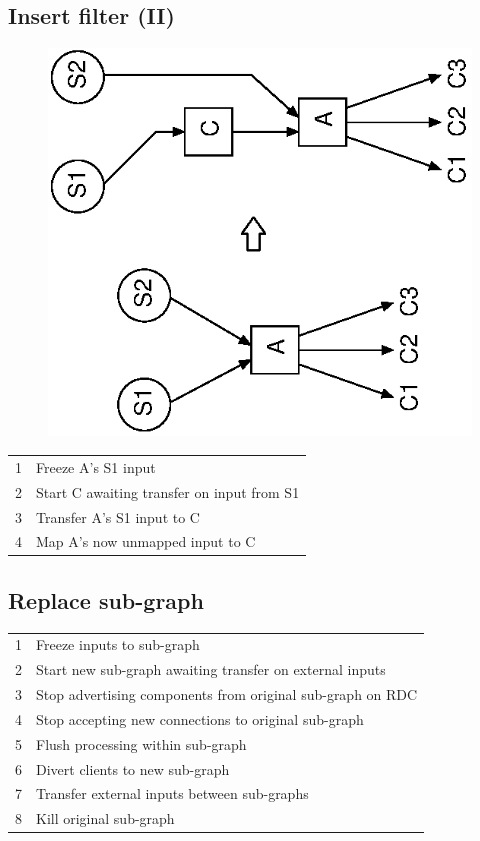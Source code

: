 \documentclass[12pt,a4paper,twoside]{article}
\renewcommand{\_}{\texttt{\symbol{95}}}
\begin{document}
\subsection{Insert filter (II)}

\begin{figure}[h]
\centering
\includegraphics[scale=1.0,angle=-90]{diagrams/insert2.eps}
\end{figure}

\begin{tabular}{ll}
1 & Freeze A's S1 input\\
2 & Start C awaiting transfer on input from S1\\
3 & Transfer A's S1 input to C\\
4 & Map A's now unmapped input to C\\
\end{tabular}

\subsection{Replace sub-graph}

\begin{tabular}{ll}
1 & Freeze inputs to sub-graph\\
2 & Start new sub-graph awaiting transfer on external inputs\\
3 & Stop advertising components from original sub-graph on RDC\\
4 & Stop accepting new connections to original sub-graph\\
5 & Flush processing within sub-graph\\
6 & Divert clients to new sub-graph\\
7 & Transfer external inputs between sub-graphs\\
8 & Kill original sub-graph\\
\end{tabular}
\end{document}
